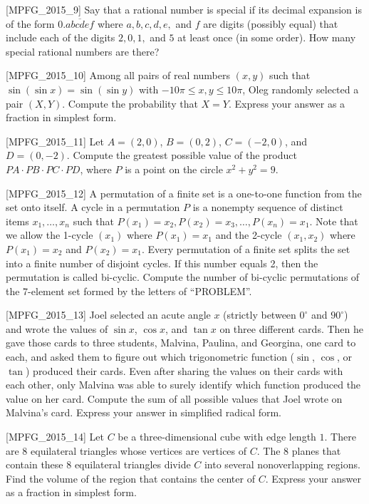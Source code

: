 [MPFG_2015_9]
Say that a rational number is special if its decimal expansion is of the form $0.\overline{abcdef}$ where $a, b, c, d, e,$ and $f$ are digits (possibly equal) that include each of the digits $2, 0, 1,$ and $5$ at least once (in some order). How many special rational numbers are there?

[MPFG_2015_10]
Among all pairs of real numbers $(x,y)$ such that $\sin(\sin x) = \sin(\sin y)$ with $-10\pi \le x, y \le 10\pi$, Oleg randomly selected a pair $(X,Y)$. Compute the probability that $X=Y$. Express your answer as a fraction in simplest form.

[MPFG_2015_11]
Let $A=(2,0)$, $B=(0,2)$, $C=(-2,0)$, and $D=(0,-2)$. Compute the greatest possible value of the product $PA \cdot PB \cdot PC \cdot PD$, where $P$ is a point on the circle $x^2 + y^2 = 9$.

[MPFG_2015_12]
A permutation of a finite set is a one-to-one function from the set onto itself. A cycle in a permutation $P$ is a nonempty sequence of distinct items $x_1, \dots, x_n$ such that $P(x_1)=x_2, P(x_2)=x_3, \dots, P(x_n)=x_1$. Note that we allow the 1-cycle $(x_1)$ where $P(x_1)=x_1$ and the 2-cycle $(x_1, x_2)$ where $P(x_1)=x_2$ and $P(x_2)=x_1$. Every permutation of a finite set splits the set into a finite number of disjoint cycles. If this number equals 2, then the permutation is called bi-cyclic. Compute the number of bi-cyclic permutations of the 7-element set formed by the letters of ``PROBLEM''.

[MPFG_2015_13]
Joel selected an acute angle $x$ (strictly between $0^\circ$ and $90^\circ$) and wrote the values of $\sin x$, $\cos x$, and $\tan x$ on three different cards. Then he gave those cards to three students, Malvina, Paulina, and Georgina, one card to each, and asked them to figure out which trigonometric function ($\sin$, $\cos$, or $\tan$) produced their cards. Even after sharing the values on their cards with each other, only Malvina was able to surely identify which function produced the value on her card. Compute the sum of all possible values that Joel wrote on Malvina's card. Express your answer in simplified radical form.

[MPFG_2015_14]
Let $C$ be a three-dimensional cube with edge length $1$. There are 8 equilateral triangles whose vertices are vertices of $C$. The 8 planes that contain these 8 equilateral triangles divide $C$ into several nonoverlapping regions. Find the volume of the region that contains the center of $C$. Express your answer as a fraction in simplest form.

